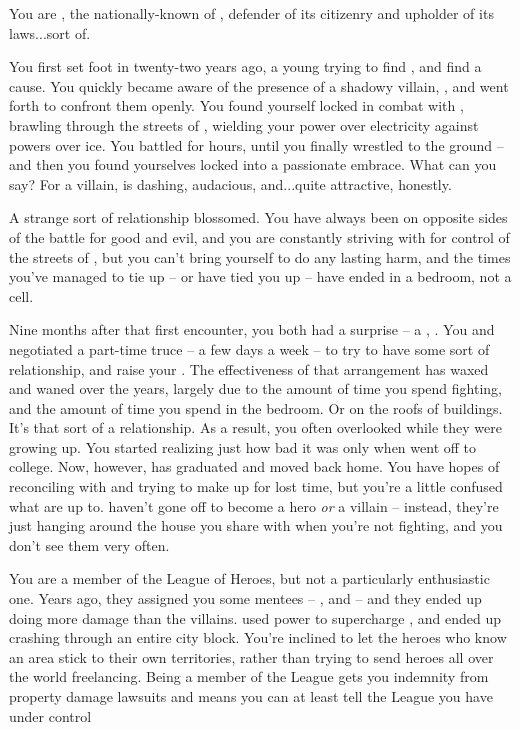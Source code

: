 \documentclass[char]{LRSguildcamp1}
\begin{document}
\name{\cOS{}}
You are \cOS{\intro}, the nationally-known \cOS{\hero} of \pCityO{}, defender of its citizenry and upholder of its laws...sort of.

You first set foot in \pCityO{} twenty-two years ago, a young \cOS{\hero} trying to find \cOS{\themself}, and find a cause.  You quickly became aware of the presence of a shadowy villain, \cOldest{\intro}, and went forth to confront them openly.  You found yourself locked in combat with \cOS{}, brawling through the streets of \pCityO{}, wielding your power over electricity against \cOldest{\their} powers over ice.  You battled for hours, until you finally wrestled \cOldest{\them} to the ground -- and then you found yourselves locked into a passionate embrace.  What can you say?  For a villain, \cOldest{} is dashing, audacious, and...quite attractive, honestly.

A strange sort of relationship blossomed.  You have always been on opposite sides of the battle for good and evil, and you are constantly striving with \cOS{\them} for control of the streets of \pCityO{}, but you can't bring yourself to do \cOS{\them} any lasting harm, and the times you've managed to tie \cOS{\them} up -- or \cOS{\they} have tied you up -- have ended in a bedroom, not a cell.

Nine months after that first encounter, you both had a surprise -- a \cGrad{\offspring}, \cGrad{\intro}.  You and \cOS{} negotiated a part-time truce -- a few days a week -- to try to have some sort of relationship, and raise your \cGrad{\offspring}.  The effectiveness of that arrangement has waxed and waned over the years, largely due to the amount of time you spend fighting, and the amount of time you spend in the bedroom.  Or on the roofs of buildings.  It's that sort of a relationship.  As a result, you often overlooked \cGrad{} while they were growing up.  You started realizing just how bad it was only when \cGrad{} went off to college.  Now, however, \cGrad{} has graduated and moved back home.  You have hopes of reconciling with \cGrad{\them} and trying to make up for lost time, but you're a little confused what \cGrad{\they} are up to.  \cGrad{\They} haven't gone off to become a hero \emph{or} a villain -- instead, they're just hanging around the house you share with \cOS{} when you're not fighting, and you don't see them very often.

You are a member of the League of Heroes, but not a particularly enthusiastic one.  Years ago, they assigned you some mentees -- \cJuggernaut{}, and \cYS{} -- and they ended up doing more damage than the villains.  \cYS{} used \cYS{\their} power to supercharge \cJuggernaut{}, and \cJuggernaut{} ended up crashing through an entire city block.    You're inclined to let the heroes who know an area stick to their own territories, rather than trying to send heroes all over the world freelancing.  Being a member of the League gets you indemnity from property damage lawsuits and means you can at least tell the League you have \pCityO{} under control
\end{document}
